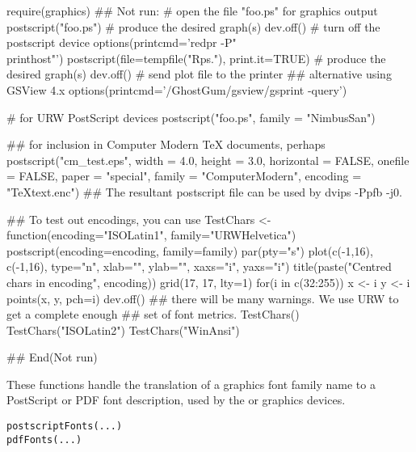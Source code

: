 \begin{Examples}
\begin{ExampleCode}
require(graphics)
## Not run: 
# open the file "foo.ps" for graphics output
postscript("foo.ps")
# produce the desired graph(s)
dev.off()              # turn off the postscript device
options(printcmd='redpr -P"\\printhost\lw"')
postscript(file=tempfile("Rps."), print.it=TRUE)
# produce the desired graph(s)
dev.off()              # send plot file to the printer
## alternative using GSView 4.x
options(printcmd='/GhostGum/gsview/gsprint -query')

# for URW PostScript devices
postscript("foo.ps", family = "NimbusSan")

## for inclusion in Computer Modern TeX documents, perhaps
postscript("cm_test.eps", width = 4.0, height = 3.0,
           horizontal = FALSE, onefile = FALSE, paper = "special",
           family = "ComputerModern", encoding = "TeXtext.enc")
## The resultant postscript file can be used by dvips -Ppfb -j0.

## To test out encodings, you can use
TestChars <- function(encoding="ISOLatin1", family="URWHelvetica")
{
    postscript(encoding=encoding, family=family)
    par(pty="s")
    plot(c(-1,16), c(-1,16), type="n", xlab="", ylab="",
         xaxs="i", yaxs="i")
    title(paste("Centred chars in encoding", encoding))
    grid(17, 17, lty=1)
    for(i in c(32:255)) {
        x <- i %
        y <- i %
        points(x, y, pch=i)
    }
    dev.off()
}
## there will be many warnings.  We use URW to get a complete enough
## set of font metrics.
TestChars()
TestChars("ISOLatin2")
TestChars("WinAnsi")

## End(Not run)

\end{ExampleCode}
\end{Examples}
%
\begin{Description}\relax
These functions handle the translation of a \R{} graphics
font family name to a PostScript or PDF font description, used by the
 or  graphics devices.
\end{Description}
%
\begin{Usage}
\begin{verbatim}
postscriptFonts(...)
pdfFonts(...)
\end{verbatim}
\end{Usage}
